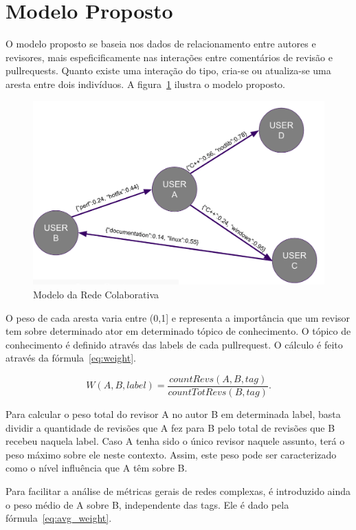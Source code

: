 \documentclass[a4paper,12pt]{monografia}
\theoremstyle{plain}
\theoremstyle{definition}
\theoremstyle{remark}
\begin{document}
\section{Modelo Proposto}

O modelo proposto se baseia nos dados de relacionamento entre autores e revisores, mais espeficificamente nas interações entre comentários de revisão e pullrequests. Quanto existe uma interação do tipo, cria-se ou atualiza-se uma aresta entre dois indivíduos. A figura~\ref{fig:ger} ilustra o modelo proposto.

\begin{figure}[!htbp]
 \includegraphics[width=\textwidth]{ger}
 \caption{Modelo da Rede Colaborativa}\label{fig:ger}
\end{figure}

O peso de cada aresta varia entre (0,1] e representa a importância que um revisor tem sobre determinado ator em determinado tópico de conhecimento. O tópico de conhecimento é definido através das labels de cada pullrequest. O cálculo é feito através da fórmula~\ref{eq:weight}.

\begin{equation}\label{eq:weight}
	W(A,B,label) = \dfrac{countRevs(A,B,tag)}{countTotRevs(B, tag)}.
\end{equation}

Para calcular o peso total do revisor A no autor B em determinada label, basta dividir a quantidade de revisões que A fez para B pelo total de revisões que B recebeu naquela label. Caso A tenha sido o único revisor naquele assunto, terá o peso máximo sobre ele neste contexto. Assim, este peso pode ser caracterizado como o nível influência que A têm sobre B.

Para facilitar a análise de métricas gerais de redes complexas, é introduzido ainda o peso médio de A sobre B, independente das tags. Ele é dado pela fórmula~\ref{eq:avg_weight}.
\end{document}
